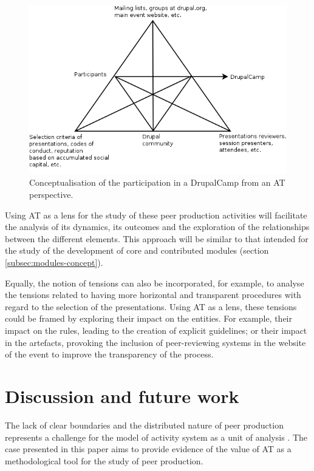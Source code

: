 \documentclass[a4paper, 12pt]{article}
\begin{document}
\begin{figure}[h]
	\centering
	\includegraphics[scale=0.65]{diagrams/drupalcamp_at.png}
	\caption{Conceptualisation of the participation in a DrupalCamp from an AT perspective.}
	\label{drupalcamp_at}
\end{figure}

Using AT as a lens for the study of these peer production activities will facilitate the analysis of its dynamics, its outcomes and the exploration of the relationships between the different elements. This approach will be similar to that intended for the study of the development of core and contributed modules (section \ref{subsec:modules-concept}). 

Equally, the notion of tensions can also be incorporated, for example, to analyse the tensions related to having more horizontal and transparent procedures with regard to the selection of the presentations. Using AT as a lens, these tensions could be framed by exploring their impact on the entities. For example, their impact on the rules, leading to the creation of explicit guidelines; or their impact in the artefacts, provoking the inclusion of peer-reviewing systems in the website of the event to improve the transparency of the process.


\section{Discussion and future work}
\label{sec:discussion-future}

The lack of clear boundaries and the distributed nature of peer production represents a challenge for the model of activity system as a unit of analysis \parencite{engestrom_future_2009}. The case presented in this paper aims to provide evidence of the value of AT as a methodological tool for the study of peer production. 
\end{document}
